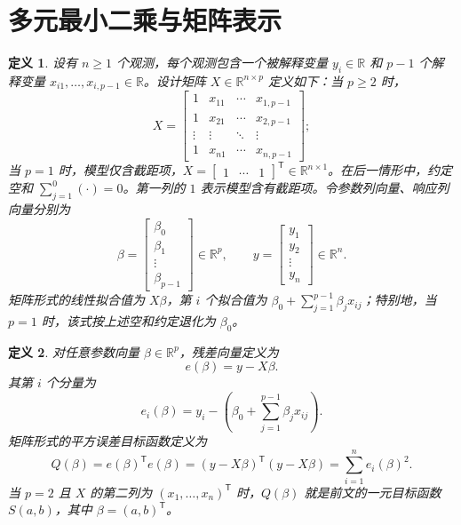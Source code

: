 \documentclass[UTF8,fontset=fandol,11pt]{ctexart}
\newtheorem{definition}{定义}[section]
\begin{document}
\section{多元最小二乘与矩阵表示}\label{sec:S02}
\begin{definition}
\label{def:design-matrix}设有 $n\geq 1$ 个观测，每个观测包含一个被解释变量 $y_i\in\mathbb{R}$ 和 $p-1$ 个解释变量 $x_{i1},\ldots,x_{i,p-1}\in\mathbb{R}$。设计矩阵 $X\in\mathbb{R}^{n\times p}$ 定义如下：当 $p\geq 2$ 时，
\[
X=\begin{bmatrix}
1&x_{11}&\cdots&x_{1,p-1}\\
1&x_{21}&\cdots&x_{2,p-1}\\
\vdots&\vdots&\ddots&\vdots\\
1&x_{n1}&\cdots&x_{n,p-1}
\end{bmatrix};
\]
当 $p=1$ 时，模型仅含截距项，$X=\begin{bmatrix}1&\cdots&1\end{bmatrix}^{\mathsf T}\in\mathbb{R}^{n\times 1}$。在后一情形中，约定空和 $\sum_{j=1}^{0}(\cdot)=0$。第一列的 $1$ 表示模型含有截距项。令参数列向量、响应列向量分别为
\[
\beta=\begin{bmatrix}\beta_0\\\beta_1\\\vdots\\\beta_{p-1}\end{bmatrix}\in\mathbb{R}^{p},
\qquad
y=\begin{bmatrix}y_1\\y_2\\\vdots\\y_n\end{bmatrix}\in\mathbb{R}^{n}.
\]
矩阵形式的线性拟合值为 $X\beta$，第 $i$ 个拟合值为 $\beta_0+\sum_{j=1}^{p-1}\beta_jx_{ij}$；特别地，当 $p=1$ 时，该式按上述空和约定退化为 $\beta_0$。
\end{definition}
\begin{definition}
对任意参数向量 $\beta\in\mathbb{R}^{p}$，残差向量定义为
\begin{equation}
e(\beta)=y-X\beta.
\label{def:residual-vector}
\end{equation}
其第 $i$ 个分量为
\[
e_i(\beta)=y_i-\left(\beta_0+\sum_{j=1}^{p-1}\beta_jx_{ij}\right).
\]
矩阵形式的平方误差目标函数定义为
\[
Q(\beta)=e(\beta)^{\mathsf T}e(\beta)=(y-X\beta)^{\mathsf T}(y-X\beta)=\sum_{i=1}^{n}e_i(\beta)^2.
\]
当 $p=2$ 且 $X$ 的第二列为 $(x_1,\ldots,x_n)^{\mathsf T}$ 时，$Q(\beta)$ 就是前文的一元目标函数 $S(a,b)$，其中 $\beta=(a,b)^{\mathsf T}$。
\end{definition}
\end{document}
